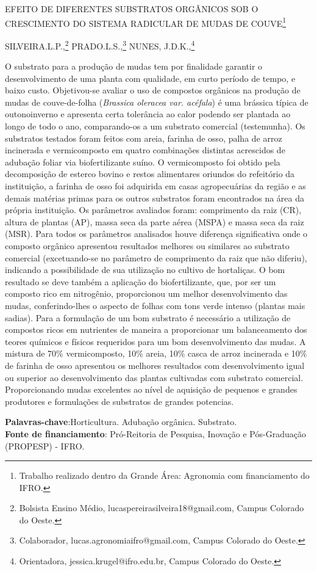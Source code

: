 \documentclass[article,12pt,onesidea,4paper,english,brazil]{abntex2}
\begin{document}
	
	
	\frenchspacing 
	
	\begin{center}
		\LARGE EFEITO DE DIFERENTES SUBSTRATOS ORGÂNICOS SOB O CRESCIMENTO
		DO SISTEMA RADICULAR DE MUDAS DE COUVE\footnote{Trabalho realizado dentro da Grande Área: Agronomia com financiamento do IFRO.}
		
		\normalsize
		SILVEIRA.L.P.,\footnote{Bolsista Ensino Médio, lucaspereirasilveira18@gmail.com, Campus Colorado do Oeste.} 
	PRADO.L.S.,\footnote{Colaborador, lucas.agronomiaifro@gmail.com, Campus Colorado do Oeste.} 
		NUNES, J.D.K.,\footnote{Orientadora, jessica.krugel@ifro.edu.br, Campus Colorado do Oeste.} 
	 
	\end{center}
	
	\noindent O substrato para a produção de mudas tem por finalidade garantir o
	desenvolvimento de uma planta com qualidade, em curto período de tempo, e baixo
	custo. Objetivou-se avaliar o uso de compostos orgânicos na produção de mudas de
	couve-de-folha (\textit{Brassica oleracea var. acéfala}) é uma brássica típica de outonoinverno
	e apresenta certa tolerância ao calor podendo ser plantada ao longo de todo
	o ano, comparando-os a um substrato comercial (testemunha). Os substratos
	testados foram feitos com areia, farinha de osso, palha de arroz incinerada e
	vermicomposto em quatro combinações distintas acrescidos de adubação foliar via
	biofertilizante suíno. O vermicomposto foi obtido pela decomposição de esterco
	bovino e restos alimentares oriundos do refeitório da instituição, a farinha de osso foi
	adquirida em casas agropecuárias da região e as demais matérias primas para os
	outros substratos foram encontrados na área da própria instituição. Os parâmetros
	avaliados foram: comprimento da raiz (CR), altura de plantas (AP), massa seca da
	parte aérea (MSPA) e massa seca da raiz (MSR). Para todos os parâmetros
	analisados houve diferença significativa onde o composto orgânico apresentou
	resultados melhores ou similares ao substrato comercial (excetuando-se no
	parâmetro de comprimento da raiz que não diferiu), indicando a possibilidade de sua
	utilização no cultivo de hortaliças. O bom resultado se deve também a aplicação do
	biofertilizante, que, por ser um composto rico em nitrogênio, proporcionou um melhor
	desenvolvimento das mudas, conferindo-lhes o aspecto de folhas com tons verde
	intenso (plantas mais sadias). Para a formulação de um bom substrato é necessário
	a utilização de compostos ricos em nutrientes de maneira a proporcionar um
	balanceamento dos teores químicos e físicos requeridos para um bom
	desenvolvimento das mudas. A mistura de 70\% vermicomposto, 10\% areia, 10\%
	casca de arroz incinerada e 10\% de farinha de osso apresentou os melhores
	resultados com desenvolvimento igual ou superior ao desenvolvimento das plantas
	cultivadas com substrato comercial. Proporcionando mudas excelentes ao nível de
	aquisição de pequenos e grandes produtores e formulações de substratos de
	grandes potencias.
	
	\vspace{\onelineskip}
	
	\noindent
	\textbf{Palavras-chave}:Horticultura. Adubação orgânica. Substrato. \\
	\textbf{Fonte de financiamento}: Pró-Reitoria de Pesquisa, Inovação e Pós-Graduação
	(PROPESP) - IFRO.
	
\end{document}
